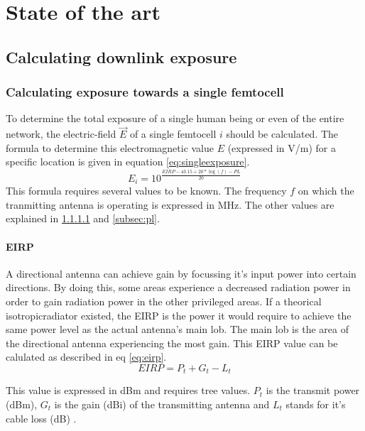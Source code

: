 \chapter{State of the art}
\label{chap:stateoftheart}
 
\section{Calculating downlink exposure}
\subsection{Calculating exposure towards a single femtocell}
\label{sec:calculatingexposure}
To determine the total exposure of a single human being or even of the entire network, the electric-field $\vec{E}$ of a single femtocell $i$ should be calculated.
The formula to determine this electromagnetic value $E$ (expressed in V/m) for a specific location is given in equation \ref{eq:singleexposure}.
\begin{equation}
E_i = 10^{\frac{EIRP - 43.15 + 20*\log(f)- PL}{20}}
\label{eq:singleexposure}
\end{equation}
This formula requires several values to be known. The frequency $f$ on which the tranmitting antenna is operating is expressed in MHz. The other values are explained in \ref{subsec:eirp} and \ref{subsec:pl}.

\subsubsection{EIRP}
\label{subsec:eirp}
A directional antenna can achieve gain by focussing it's input power into certain directions. By doing this, some areas experience a decreased radiation power in order to gain radiation power 
in the other privileged areas. If a theorical \gls{isotropicradiator} existed, the \gls{EIRP} is the power it would require to achieve the same power level as the actual antenna's main lob. The main lob is the area of the directional antenna experiencing the most gain.
This \gls{EIRP} value can be calulated as described in eq \ref{eq:eirp}.
\begin{equation}
EIRP = P_t + G_t - L_t
\label{eq:eirp}
\end{equation}

This value is expressed in dBm and requires tree values. $P_t$ is the transmit power (dBm), $G_t$ is the gain (dBi) of the transmitting antenna and $L_t$ stands for it's cable loss (dB) \cite{howToCalculateEIRP}.

